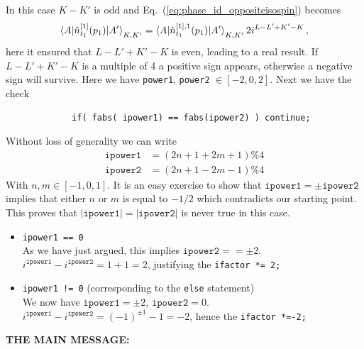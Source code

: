 \documentclass[10pt]{article}
\begin{document}
\begin{itemize}
\begin{itemize}
				In this case $K-K'$ is odd and Eq.~(\ref{eq:phase_id_oppositeisospin}) becomes
				\begin{align}
					\braket{ A | \hat{n}_{t_1}^{[1]}(p_1) | A'}_{K,K'} = \braket{ A | \hat{n}_{t_1}^{[1],1}(p_1) | A'}_{K,K'} 2 i^{L-L'+K'-K} \, ,
				\end{align}
				here it ensured that $L-L'+K'-K$ is even, leading to a real result. If $L-L'+K'-K$ is a multiple of 4 a positive sign appears, otherwise a negative sign will survive.
				Here we have \texttt{power1}, \texttt{power2} $\in [-2,0,2]$.
			Next we have the check
			\begin{verbatim}
			 if( fabs( ipower1) == fabs(ipower2) ) continue;
			 \end{verbatim}
			 Without loss of generality we can write
			 \begin{align*}
			 	\texttt{ipower1} &= (2n+1 + 2m+1) \% 4 \\
			 	\texttt{ipower2} &= (2n+1 - 2m-1) \% 4
			 \end{align*}
			 With $n,m \in [-1,0,1]$. It is an easy exercise to show that $\texttt{ipower1} = \pm \texttt{ipower2}$ implies that either $n$ or $m$ is equal to $-1/2$ which contradicts our starting point. This proves that $ | \texttt{ipower1} | = | \texttt{ipower2} |$ is never true in this case.
			 \begin{itemize}
			 	\item \texttt{ipower1 == 0} \\
			 		As we have just argued, this implies $\texttt{ipower2} == \pm 2$. $i^{\texttt{ipower1}} - i^{\texttt{ipower2}} = 1 + 1 = 2$, justifying the \texttt{ifactor *= 2;}
			 	\item \texttt{ipower1 != 0} (corresponding to the \texttt{else} statement) \\
			 		We now have $\texttt{ipower1} = \pm 2$, $\texttt{ipower2} = 0$. $i^{\texttt{ipower1}} - i^{\texttt{ipower2}} = (-1)^{\pm 1} -1 = -2$, hence the \texttt{ifactor *=-2;}
			 \end{itemize}
		\end{itemize}
\end{itemize}
\textbf{THE MAIN MESSAGE:}
\end{document}
